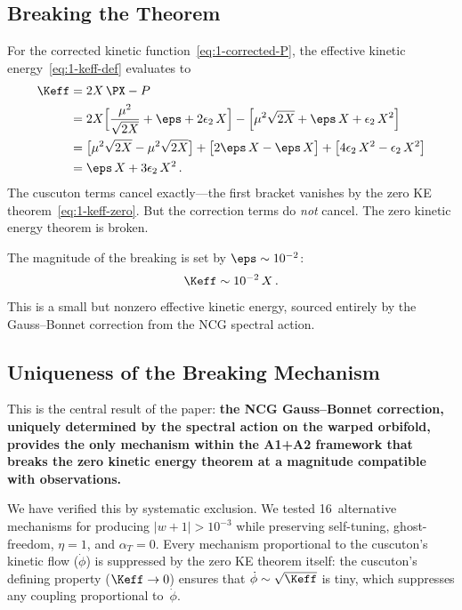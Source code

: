 \subsection{Breaking the Theorem}
\label{sec:1-breaking}

For the corrected kinetic function~\eqref{eq:1-corrected-P}, the effective kinetic energy~\eqref{eq:1-keff-def} evaluates to
\begin{align}
\label{eq:1-keff-broken}
\Keff &= 2X\,\PX - P \notag\\
&= 2X\Bigl[\frac{\mu^2}{\sqrt{2X}} + \eps + 2\epsilon_2\, X\Bigr] - \Bigl[\mu^2\sqrt{2X} + \eps\, X + \epsilon_2\, X^2\Bigr] \notag\\
&= \bigl[\mu^2\sqrt{2X} - \mu^2\sqrt{2X}\bigr] + \bigl[2\eps\, X - \eps\, X\bigr] + \bigl[4\epsilon_2\, X^2 - \epsilon_2\, X^2\bigr] \notag\\
&= \eps\, X + 3\epsilon_2\, X^2\,.
\end{align}
The cuscuton terms cancel exactly---the first bracket vanishes by the zero KE theorem~\eqref{eq:1-keff-zero}. But the correction terms do \emph{not} cancel. The zero kinetic energy theorem is broken.

The magnitude of the breaking is set by $\eps \sim 10^{-2}$:
\begin{equation}
\label{eq:1-keff-magnitude}
\Keff \sim 10^{-2}\, X\,.
\end{equation}
This is a small but nonzero effective kinetic energy, sourced entirely by the Gauss--Bonnet correction from the NCG spectral action.

\subsection{Uniqueness of the Breaking Mechanism}
\label{sec:1-uniqueness-breaking}

This is the central result of the paper: \textbf{the NCG Gauss--Bonnet correction, uniquely determined by the spectral action on the warped orbifold, provides the only mechanism within the A1+A2 framework that breaks the zero kinetic energy theorem at a magnitude compatible with observations.}

We have verified this by systematic exclusion. We tested 16~alternative mechanisms for producing $|w + 1| > 10^{-3}$ while preserving self-tuning, ghost-freedom, $\eta = 1$, and $\alpha_T = 0$. Every mechanism proportional to the cuscuton's kinetic flow ($\dot\phi$) is suppressed by the zero KE theorem itself: the cuscuton's defining property ($\Keff \to 0$) ensures that $\dot\phi \sim \sqrt{\Keff}$ is tiny, which suppresses any coupling proportional to~$\dot\phi$.

